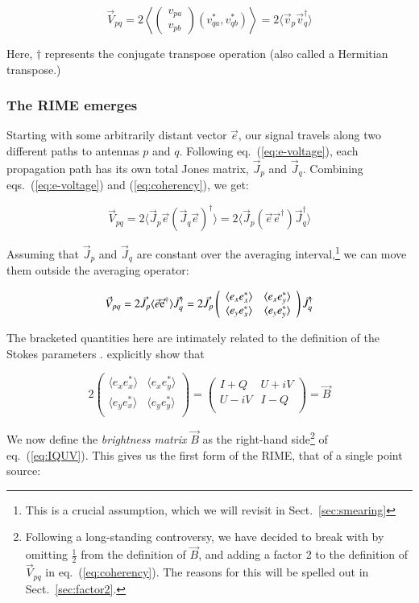 \documentclass[]{aa}
\newcommand{\matrixtt}[4]{\left( \begin{array}{cc}#1&#2\\#3&#4\\\end{array} \right)}
\begin{document}
\begin{equation}\label{eq:coherency}
\vec V_{pq} = 2 \left<\left( \begin{array}{c}v_{pa}\\v_{pb}\end{array} \right) (v^*_{qa},v^*_{qb}) \right > = 2 \langle \vec v_p \vec v^\dagger_q \rangle
\end{equation}

Here, $\dagger$ represents the conjugate transpose operation (also called a Hermitian transpose.)

\subsubsection{\label{sec:RIME-emerges}The RIME emerges}

Starting with some arbitrarily distant vector $\vec e$, our signal travels along two different paths to antennas $p$ and $q$. Following eq.~(\ref{eq:e-voltage}), each propagation path has its own total Jones matrix, $\vec J_p$ and $\vec J_q$. Combining eqs.~(\ref{eq:e-voltage}) and (\ref{eq:coherency}), we get:

    \[
    \vec V_{pq} = 2 \langle  \vec J_p \vec e ( \vec J_q \vec e )^\dagger \rangle  = 2 \langle  \vec J_p (\vec e \vec e^\dagger) \vec J^\dagger_q \rangle 
    \]

Assuming that $\vec J_p$ and $\vec J_q$ are constant over the averaging interval,\footnote{This is a crucial assumption, which we will revisit in Sect.~\ref{sec:smearing}} we can move them outside the averaging operator:

    \[
    \vec V_{pq} = 2 \vec J_p \langle  \vec e \vec {\rm e}^\dagger \rangle  \vec J^\dagger_q = 
    2 \vec J_p 
    \matrixtt{\langle e_x e^*_x\rangle }{\langle e_x e^*_y\rangle }{\langle e_y e^*_x\rangle }{\langle e_y e^*_y\rangle }
    \vec J^\dagger_q
    \]

The bracketed quantities here are intimately related to the definition of the Stokes parameters \citep{born-wolf,tms}. \citet{ME3} explicitly show that

    \begin{equation}\label{eq:IQUV}
    2 
    \matrixtt{\langle e_x e^*_x\rangle }{\langle e_x e^*_y\rangle }{\langle e_y e^*_x\rangle }{\langle e_y e^*_y\rangle }
    = 
    \matrixtt{I+Q}{U+iV}{U-iV}{I-Q} = \vec B
    \end{equation}

We now define the {\em brightness matrix} $\vec B$ as the right-hand side\footnote{Following a long-standing controversy, we have decided to break with \citet{ME4} by omitting $\frac{1}{2}$ from the definition of $\vec B$, and adding a factor 2 to the definition of $\vec V_{pq}$ in eq.~(\ref{eq:coherency}). The reasons for this will be spelled out in Sect.~\ref{sec:factor2}.} of eq.~(\ref{eq:IQUV}). This gives us the first form of the RIME, that of a single point source:
\end{document}
